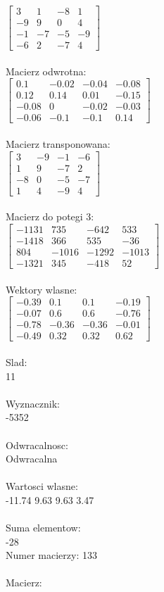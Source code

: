 \documentclass[a4paper,12pt]{article}
\begin{document}
$\begin{bmatrix} 3&1&-8&1\\-9&9&0&4\\-1&-7&-5&-9\\-6&2&-7&4 \end{bmatrix}$
\\
\\
Macierz odwrotna:\\

$\begin{bmatrix} 0.1&-0.02&-0.04&-0.08\\0.12&0.14&0.01&-0.15\\-0.08&0&-0.02&-0.03\\-0.06&-0.1&-0.1&0.14 \end{bmatrix}$
\\
\\
Macierz transponowana:\\

$\begin{bmatrix} 3&-9&-1&-6\\1&9&-7&2\\-8&0&-5&-7\\1&4&-9&4 \end{bmatrix}$
\\
\\
Macierz do potegi 3:\\

$\begin{bmatrix} -1131&735&-642&533\\-1418&366&535&-36\\804&-1016&-1292&-1013\\-1321&345&-418&52 \end{bmatrix}$
\\
\\
Wektory wlasne:\\

$\begin{bmatrix} -0.39&0.1&0.1&-0.19\\-0.07&0.6&0.6&-0.76\\-0.78&-0.36&-0.36&-0.01\\-0.49&0.32&0.32&0.62 \end{bmatrix}$
\\
\\
Slad:\\
11
\\
\\
Wyznacznik:\\
-5352
\\
\\
Odwracalnosc:\\
Odwracalna
\\
\\
Wartosci wlasne:\\
-11.74 9.63 9.63 3.47
\\
\\
Suma elementow:\\
-28
\\
\newpage
Numer macierzy:
133
\\
\\
Macierz:\\
\end{document}
